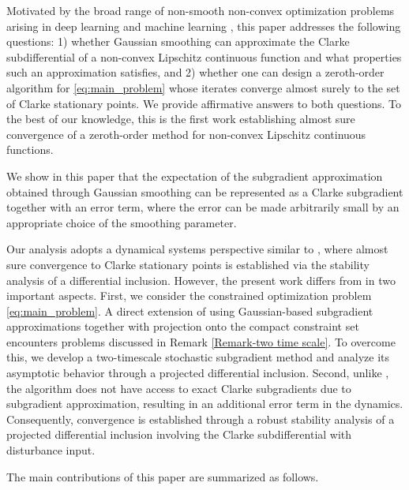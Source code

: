 \documentclass[9pt,journal,twoside,web]{ieeecolor}
\begin{document}
Motivated by the broad range of non-smooth non-convex optimization problems arising in deep learning and machine learning \cite{bolte2021conservative}, this paper addresses the following questions: 1) whether Gaussian smoothing can approximate the Clarke subdifferential of a non-convex Lipschitz continuous function and what properties such an approximation satisfies, and 2) whether one can design a zeroth-order algorithm for \eqref{eq:main_problem} whose iterates converge almost surely to the set of Clarke stationary points. We provide affirmative answers to both questions. To the best of our knowledge, this is the first work establishing almost sure convergence of a zeroth-order method for non-convex Lipschitz continuous functions. 
\color{black}

We show in this paper that the expectation of the subgradient approximation obtained through Gaussian smoothing can be represented as a Clarke subgradient together with an error term, where the error can be made arbitrarily small by an appropriate choice of the smoothing parameter.

Our analysis adopts a dynamical systems perspective similar to \cite{bianchi2022convergence,bianchi2003solution}, where almost sure convergence to Clarke stationary points is established via the stability analysis of a differential inclusion. However, the present work differs from \cite{bianchi2022convergence,bianchi2003solution} in two important aspects. First, we consider the constrained optimization problem \eqref{eq:main_problem}. A direct extension of \cite{bianchi2022convergence} using Gaussian-based subgradient approximations together with projection onto the compact constraint set encounters problems discussed in Remark \ref{Remark-two time scale}. To overcome this, we develop a two-timescale stochastic subgradient method and analyze its asymptotic behavior through a projected differential inclusion. Second, unlike \cite{bianchi2003solution,bianchi2022convergence}, the algorithm does not have access to exact Clarke subgradients due to subgradient approximation, resulting in an additional error term in the dynamics. Consequently, convergence is established through a robust stability analysis of a projected differential inclusion involving the Clarke subdifferential with disturbance input.


\color{black}




 The main contributions of this paper are summarized as follows. 
\end{document}
